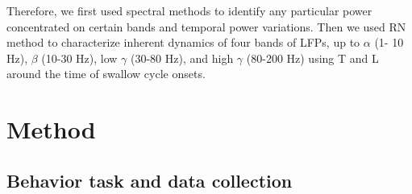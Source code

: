\documentclass[letterpaper, 9pt, conference]{ieeeconf}
\begin{document}
Therefore, we first used spectral methods to identify any particular power concentrated on certain bands and temporal power variations. Then we used RN method to characterize inherent dynamics of four bands of LFPs, up to $\alpha$ (1- 10 Hz), $\beta$ (10-30 Hz), low $\gamma$ (30-80 Hz), and high $\gamma$ (80-200 Hz) using T and L around the time of swallow cycle onsets. 






\section{Method}
\label{sec:method}

\subsection{Behavior task and data collection}
\end{document}
